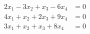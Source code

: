 \begin{align*}
2x_1  - 3x_2 + x_3 - 6x_4 &= 0 \\
4x_1 +x_2 +2x_3 + 9x_4 &= 0 \\
3x_1 +x_2 +x_3 + 8x_4 &=  0  
\end{align*}